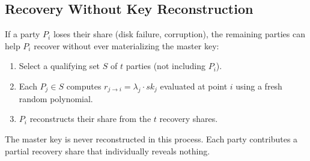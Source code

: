\subsection{Recovery Without Key Reconstruction}

If a party $P_i$ loses their share (disk failure, corruption), the remaining parties
can help $P_i$ recover without ever materializing the master key:

\begin{enumerate}[leftmargin=2em]
  \item Select a qualifying set $S$ of $t$ parties (not including $P_i$).
  \item Each $P_j \in S$ computes $r_{j \to i} = \lambda_j \cdot sk_j$ evaluated at
        point $i$ using a fresh random polynomial.
  \item $P_i$ reconstructs their share from the $t$ recovery shares.
\end{enumerate}

The master key is never reconstructed in this process. Each party contributes a
partial recovery share that individually reveals nothing.


